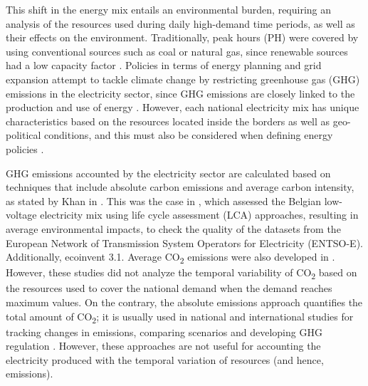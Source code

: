 
This shift in the energy mix entails an environmental burden, requiring an analysis of the resources used during  daily high-demand time periods, as well as their effects on the environment. Traditionally, peak hours (PH) were covered by using conventional sources such as coal or natural gas, since renewable sources had a low capacity factor \cite{NEVES2018905}. Policies in terms of energy planning and grid expansion attempt to tackle  climate change by restricting greenhouse gas (GHG) emissions in the electricity sector, since GHG emissions are closely linked to the production and use of energy \cite{Sinn2008PublicApproach}. However, each national electricity mix has unique characteristics based on the resources located inside the borders as well as geo-political conditions, and this must also be considered when defining energy policies \cite{H.Murdock2018H.Transition.pdf, DAHAL2018222, LEVIN201953, BEST2018404, ZHAO2018303, SIMOES2017353}. 

{GHG emissions accounted by the electricity sector are calculated based on techniques that include absolute carbon emissions and average carbon intensity, as stated by Khan in \cite{Khan2019CarbonIntensity}. This was the case in \cite{Buyle2019}, which assessed the Belgian low-voltage electricity mix using life cycle assessment (LCA) approaches, resulting in average environmental impacts, to check the quality of the datasets from the European Network of Transmission System Operators for Electricity (ENTSO-E). Additionally, ecoinvent 3.1. Average CO\textsubscript2 emissions were also developed in \cite{Jones2017AnGeneration, PATTUPARA2016152}. However, these studies did not analyze the temporal variability of CO\textsubscript2 based on the resources used to cover the national demand when the demand reaches maximum values. On the contrary, the absolute emissions approach quantifies the total amount of CO\textsubscript2; it is usually used in national and international studies for tracking changes in emissions, comparing scenarios and developing GHG regulation \cite{IEA2018electricity, eun2016does, Richeson2019, ZHANG2013159}. However, these approaches are not useful for accounting the electricity produced with the temporal variation of resources (and hence, emissions).}

